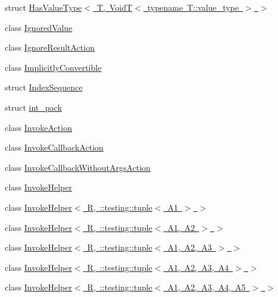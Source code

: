 \begin{DoxyCompactItemize}
\item 
struct \mbox{\hyperlink{structtesting_1_1internal_1_1_has_value_type_3_01_t_00_01_void_t_3_01typename_01_t_1_1value__type_01_4_01_4}{Has\+Value\+Type$<$ T, Void\+T$<$ typename T\+::value\+\_\+type $>$ $>$}}
\item 
class \mbox{\hyperlink{classtesting_1_1internal_1_1_ignored_value}{Ignored\+Value}}
\item 
class \mbox{\hyperlink{classtesting_1_1internal_1_1_ignore_result_action}{Ignore\+Result\+Action}}
\item 
class \mbox{\hyperlink{classtesting_1_1internal_1_1_implicitly_convertible}{Implicitly\+Convertible}}
\item 
struct \mbox{\hyperlink{structtesting_1_1internal_1_1_index_sequence}{Index\+Sequence}}
\item 
struct \mbox{\hyperlink{structtesting_1_1internal_1_1int__pack}{int\+\_\+pack}}
\item 
class \mbox{\hyperlink{classtesting_1_1internal_1_1_invoke_action}{Invoke\+Action}}
\item 
class \mbox{\hyperlink{classtesting_1_1internal_1_1_invoke_callback_action}{Invoke\+Callback\+Action}}
\item 
class \mbox{\hyperlink{classtesting_1_1internal_1_1_invoke_callback_without_args_action}{Invoke\+Callback\+Without\+Args\+Action}}
\item 
class \mbox{\hyperlink{classtesting_1_1internal_1_1_invoke_helper}{Invoke\+Helper}}
\item 
class \mbox{\hyperlink{classtesting_1_1internal_1_1_invoke_helper_3_01_r_00_01_1_1testing_1_1tuple_3_01_a1_01_4_01_4}{Invoke\+Helper$<$ R, \+::testing\+::tuple$<$ A1 $>$ $>$}}
\item 
class \mbox{\hyperlink{classtesting_1_1internal_1_1_invoke_helper_3_01_r_00_01_1_1testing_1_1tuple_3_01_a1_00_01_a2_01_4_01_4}{Invoke\+Helper$<$ R, \+::testing\+::tuple$<$ A1, A2 $>$ $>$}}
\item 
class \mbox{\hyperlink{classtesting_1_1internal_1_1_invoke_helper_3_01_r_00_01_1_1testing_1_1tuple_3_01_a1_00_01_a2_00_01_a3_01_4_01_4}{Invoke\+Helper$<$ R, \+::testing\+::tuple$<$ A1, A2, A3 $>$ $>$}}
\item 
class \mbox{\hyperlink{classtesting_1_1internal_1_1_invoke_helper_3_01_r_00_01_1_1testing_1_1tuple_3_01_a1_00_01_a2_00_01_a3_00_01_a4_01_4_01_4}{Invoke\+Helper$<$ R, \+::testing\+::tuple$<$ A1, A2, A3, A4 $>$ $>$}}
\item 
class \mbox{\hyperlink{classtesting_1_1internal_1_1_invoke_helper_3_01_r_00_01_1_1testing_1_1tuple_3_01_a1_00_01_a2_00_5dd6c0827e45a39a81d93a14211e2a19}{Invoke\+Helper$<$ R, \+::testing\+::tuple$<$ A1, A2, A3, A4, A5 $>$ $>$}}

\end{DoxyCompactItemize}
